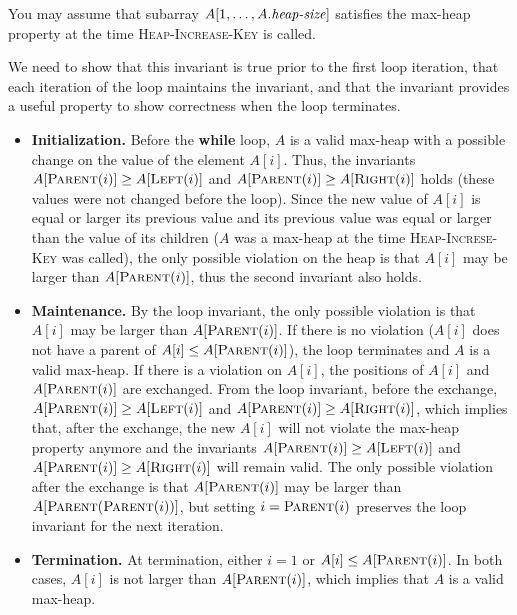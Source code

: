 \begin{enumerate}
{\begin{quote}
\end{quote}
You may assume that subarray $A[1, \dots, A.\text{\emph{heap-size}}]$
satisfies the max-heap property at the time \textsc{Heap-Increase-Key} is
called.
}

\begin{framed}
We need to show that this invariant is true prior to the first loop iteration,
that each iteration of the loop maintains the invariant, and that the invariant
provides a useful property to show correctness when the loop terminates.

\begin{itemize}
\item \textbf{Initialization.} Before the \textbf{while} loop, $A$ is
a valid max-heap with a possible change on the value of the element $A[i]$.
Thus, the invariants $A[\textsc{Parent}(i)] \ge A[\textsc{Left}(i)]$ and
$A[\textsc{Parent}(i)] \ge A[\textsc{Right}(i)]$ holds (these values were
not changed before the loop). Since the new value of $A[i]$ is equal or larger
its previous value and its previous value was equal or larger than the value of
its children ($A$ was a max-heap at the time \textsc{Heap-Increse-Key}
was called), the only possible violation on the heap is that $A[i]$ may be
larger than $A[\textsc{Parent}(i)]$, thus the second invariant also holds.
\item \textbf{Maintenance.} By the loop invariant, the only possible violation
is that $A[i]$ may be larger than $A[\textsc{Parent}(i)]$. If there is no
violation ($A[i]$ does not have a parent of $A[i] \le A[\textsc{Parent}(i)]$),
the loop terminates and $A$ is a valid max-heap. If there is a violation on
$A[i]$, the positions of $A[i]$ and $A[\textsc{Parent}(i)]$ are exchanged.
From the loop invariant, before the exchange,
$A[\textsc{Parent}(i)] \ge A[\textsc{Left}(i)]$ and
$A[\textsc{Parent}(i)] \ge A[\textsc{Right}(i)]$, which implies that, after
the exchange, the new $A[i]$ will not violate the max-heap property anymore and
the invariants $A[\textsc{Parent}(i)] \ge A[\textsc{Left}(i)]$ and
$A[\textsc{Parent}(i)] \ge A[\textsc{Right}(i)]$ will remain valid. The only
possible violation after the exchange is that $A[\textsc{Parent}(i)]$ may be
larger than $A[\textsc{Parent}(\textsc{Parent}(i))]$, but setting
$i = \textsc{Parent}(i)$ preserves the loop invariant for the next iteration.
\item \textbf{Termination.} At termination, either $i = 1$ or
$A[i] \le A[\textsc{Parent}(i)]$. In both cases, $A[i]$ is not larger than
$A[\textsc{Parent}(i)]$, which implies that $A$ is a valid max-heap.
\end{itemize}
\end{framed}


\end{enumerate}

